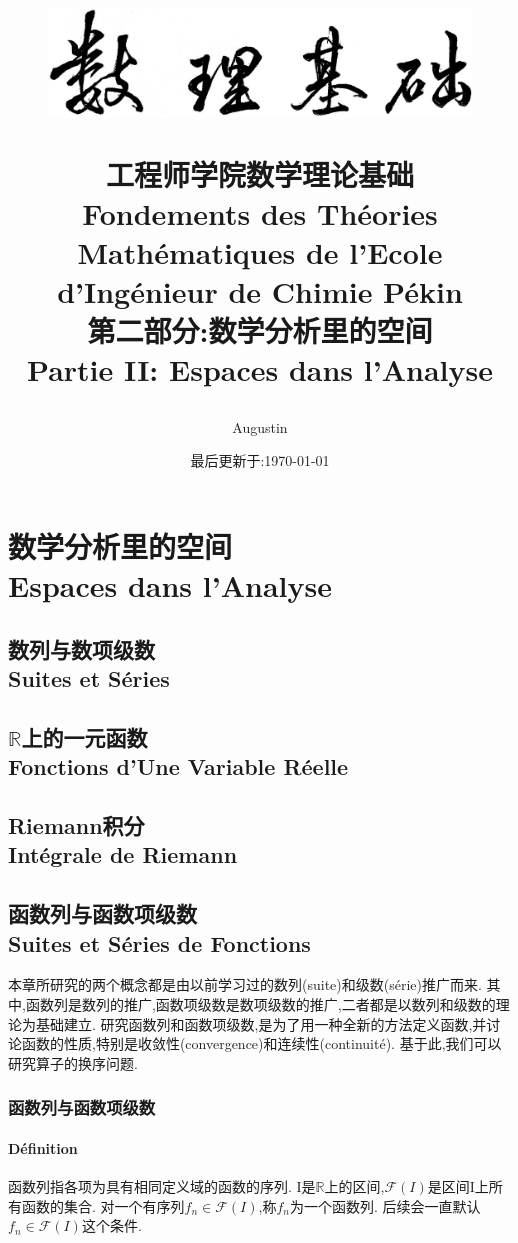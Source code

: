 \documentclass[12pt, a4paper, oneside]{ctexbook}
\title{
\vspace{-2cm}
  \begin{figure}[!t]%
    \centering
    \includegraphics[width=14cm]{shulijichu-2.png}
  \end{figure}
  \vspace{-2cm}
  {\Huge{\textbf{工程师学院数学理论基础\\
Fondements des Théories Mathématiques de l'Ecole d'Ingénieur de Chimie Pékin\\
第二部分:数学分析里的空间\\
Partie II: Espaces dans l'Analyse
}}}
}
\author{Augustin}
\date{最后更新于:\today}
\newcommand{\R }{\mathbb{R}}%
\begin{document}
\vspace{-3cm}
\maketitle
\tableofcontents
\else
\part{数学分析里的空间\\ Espaces dans l'Analyse}
\fi

\chapter{数列与数项级数\\Suites et Séries}

\chapter{$\R$上的一元函数\\ Fonctions d'Une Variable Réelle}

\chapter{Riemann积分\\ Intégrale de Riemann}

\chapter{函数列与函数项级数\\Suites et Séries de Fonctions}
  本章所研究的两个概念都是由以前学习过的数列(suite)和级数(série)推广而来.
  其中,函数列是数列的推广,函数项级数是数项级数的推广,二者都是以数列和级数的理论为基础建立.
  研究函数列和函数项级数,是为了用一种全新的方法定义函数,并讨论函数的性质,特别是收敛性(convergence)和连续性(continuité).
  基于此,我们可以研究算子的换序问题.

\section{函数列与函数项级数}
  \subsection{Définition}
  函数列指各项为具有相同定义域的函数的序列.
  I是$\R$上的区间,$\mathcal{F}(I)$是区间I上所有函数的集合.
  对一个有序列${f_n}\in\mathcal{F}(I)$,称${f_n}$为一个函数列.
  后续会一直默认${f_n}\in\mathcal{F}(I)$这个条件.\\
\end{document}
